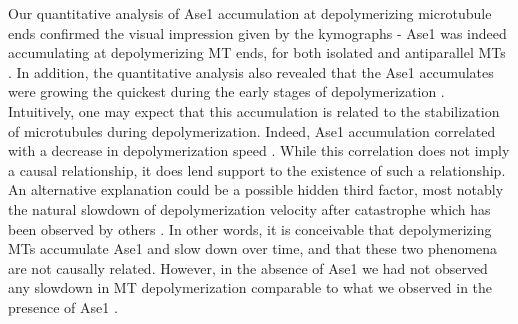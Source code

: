 Our quantitative analysis of Ase1 accumulation at depolymerizing microtubule ends confirmed the visual impression given by the kymographs - Ase1 was indeed accumulating at depolymerizing MT ends, for both isolated and antiparallel MTs . In addition, the quantitative analysis also revealed that the Ase1 accumulates were growing the quickest during the early stages of depolymerization . Intuitively, one may expect that this accumulation is related to the stabilization of microtubules during depolymerization. Indeed, Ase1 accumulation correlated with a decrease in depolymerization speed . While this correlation does not imply a causal relationship, it does lend support to the existence of such a relationship. An alternative explanation could be a possible hidden third factor, most notably the natural slowdown of depolymerization velocity after catastrophe which has been observed by others \parencite{Luchniak2023}. In other words, it is conceivable that depolymerizing MTs accumulate Ase1 and slow down over time, and that these two phenomena are not causally related. However, in the absence of Ase1 we had not observed any slowdown in MT depolymerization comparable to what we observed in the presence of Ase1 . \par

